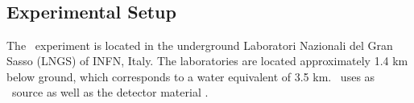 \documentclass[encoding=utf8,british]{tumphthesis}
\begin{document}


 


\section{\gerda\ \PII}
\label{sec:gerda}


\subsection{Experimental Setup}
\label{sec:ExSetup}
The \gerda\ experiment is located in the underground Laboratori Nazionali del Gran Sasso (LNGS) of INFN, Italy.
The laboratories are located approximately 1.4 km below ground, which corresponds to a water equivalent of 3.5 km.
\gerda\ uses  as \onbb\ source as well as the detector material \cite{agostini_background_2017}.
\\
\end{document}
